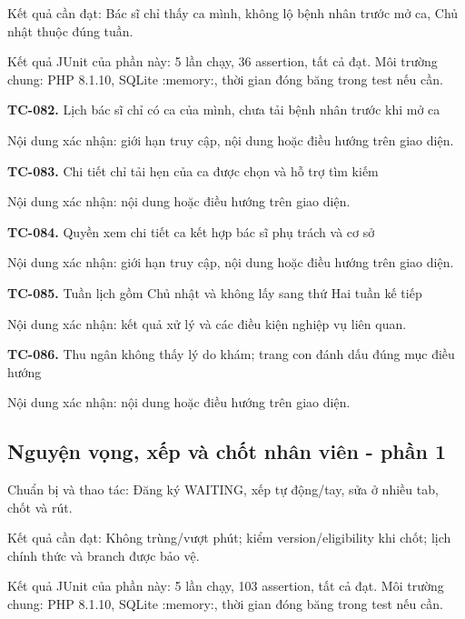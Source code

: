 Kết quả cần đạt:\allowbreak{} Bác sĩ chỉ thấy ca mình, không lộ bệnh nhân trước mở ca, Chủ nhật thuộc đúng tuần.\allowbreak{}

Kết quả JUnit của phần này:\allowbreak{} 5 lần chạy, 36 assertion, tất cả đạt.\allowbreak{} Môi trường chung:\allowbreak{} PHP 8.\allowbreak{}1.\allowbreak{}10, SQLite :\allowbreak{}memory:\allowbreak{}, thời gian đóng băng trong test nếu cần.\allowbreak{}

\noindent\textbf{TC-082.} Lịch bác sĩ chỉ có ca của mình, chưa tải bệnh nhân trước khi mở ca\par
Nội dung xác nhận:\allowbreak{} giới hạn truy cập, nội dung hoặc điều hướng trên giao diện.\allowbreak{}

\noindent\textbf{TC-083.} Chi tiết chỉ tải hẹn của ca được chọn và hỗ trợ tìm kiếm\par
Nội dung xác nhận:\allowbreak{} nội dung hoặc điều hướng trên giao diện.\allowbreak{}

\noindent\textbf{TC-084.} Quyền xem chi tiết ca kết hợp bác sĩ phụ trách và cơ sở\par
Nội dung xác nhận:\allowbreak{} giới hạn truy cập, nội dung hoặc điều hướng trên giao diện.\allowbreak{}

\noindent\textbf{TC-085.} Tuần lịch gồm Chủ nhật và không lấy sang thứ Hai tuần kế tiếp\par
Nội dung xác nhận:\allowbreak{} kết quả xử lý và các điều kiện nghiệp vụ liên quan.\allowbreak{}

\noindent\textbf{TC-086.} Thu ngân không thấy lý do khám; trang con đánh dấu đúng mục điều hướng\par
Nội dung xác nhận:\allowbreak{} nội dung hoặc điều hướng trên giao diện.\allowbreak{}


\par\vspace{8pt}

\subsection{Nguyện vọng, xếp và chốt nhân viên - phần 1}
Chuẩn bị và thao tác:\allowbreak{} Đăng ký WAITING, xếp tự động/\allowbreak{}tay, sửa ở nhiều tab, chốt và rút.\allowbreak{}

Kết quả cần đạt:\allowbreak{} Không trùng/\allowbreak{}vượt phút; kiểm version/\allowbreak{}eligibility khi chốt; lịch chính thức và branch được bảo vệ.\allowbreak{}

Kết quả JUnit của phần này:\allowbreak{} 5 lần chạy, 103 assertion, tất cả đạt.\allowbreak{} Môi trường chung:\allowbreak{} PHP 8.\allowbreak{}1.\allowbreak{}10, SQLite :\allowbreak{}memory:\allowbreak{}, thời gian đóng băng trong test nếu cần.\allowbreak{}

